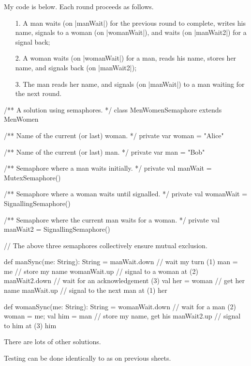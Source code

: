 \begin{answer}
My code is below.  Each round proceeds as follows.
%
\begin{enumerate}
\item[1.] A man waits (on |manWait|) for the previous round to complete, writes
his name, signals to a woman (on |womanWait|), and waits (on |manWait2|) for a
signal back;

\item[2.] A woman waits (on |womanWait|) for a man, reads his name, stores her
name, and signals back (on |manWait2|);

\item[3.] The man reads her name, and signals (on |manWait|) to a man waiting for
the next round.
\end{enumerate}
%
\begin{scala}
/** A solution using semaphores. */
class MenWomenSemaphore extends MenWomen{
  /** Name of the current (or last) woman. */
  private var woman = "Alice"

  /** Name of the current (or last) man. */
  private var man = "Bob"

  /** Semaphore where a man waits initially. */
  private val manWait = MutexSemaphore()

  /** Semaphore where a woman waits until signalled. */
  private val womanWait = SignallingSemaphore()

  /** Semaphore where the current man waits for a woman. */
  private val manWait2 = SignallingSemaphore()

  // The above three semaphores collectively ensure mutual exclusion.

  def manSync(me: String): String = {
    manWait.down    // wait my turn (1)
    man = me         // store my name
    womanWait.up    // signal to a woman at (2)
    manWait2.down   // wait for an acknowledgement (3)
    val her = woman // get her name
    manWait.up       // signal to the next man at (1)
    her
  }

  def womanSync(me: String): String = {
    womanWait.down                // wait for a man (2)
    woman = me; val him = man // store my name, get his
    manWait2.up                    // signal to him at (3)
    him
  }
}
\end{scala}

There are lots of other solutions.

Testing can be done identically to as on previous sheets.
\end{answer}
